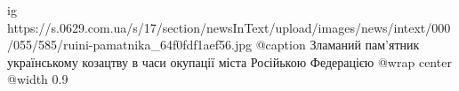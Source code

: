  
 
 
 
 

\ifcmt
  ig https://s.0629.com.ua/s/17/section/newsInText/upload/images/news/intext/000/055/585/ruini-pamatnika_64f0fdf1aef56.jpg
	@caption Зламаний пам'ятник українському козацтву в часи окупації міста Російькою Федерацією
  @wrap center
  @width 0.9
\fi
